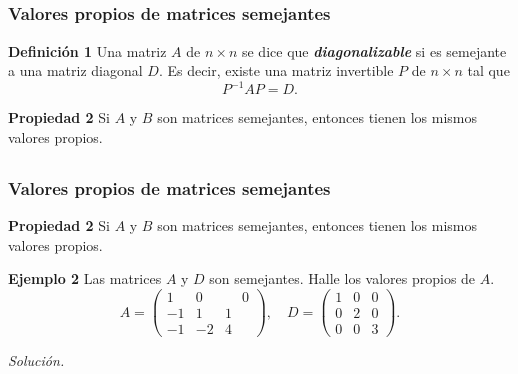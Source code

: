 
\subsection{}

\begin{frame}\frametitle{Valores propios de matrices semejantes}

\begin{defi}{\textbf{Definición 1}}\justifying
	\justifying
	Una matriz $A$ de $n\times n$ se dice que \textbf{\textit{diagonalizable}} si es semejante a una matriz
	diagonal $D$. Es decir, existe una matriz invertible $P$  de $n\times n$  tal que 
	\[
		P^{-1}AP = D.
	\]
\end{defi}	

\begin{prop}{\textbf{Propiedad 2}}
	\justifying
	Si $A$ y $B$ son matrices semejantes, entonces tienen los mismos valores propios.
\end{prop}	

\end{frame}


\subsection{}

\begin{frame}\frametitle{Valores propios de matrices semejantes}
	
	\begin{prop}{\textbf{Propiedad 2}}
		\justifying
		Si $A$ y $B$ son matrices semejantes, entonces tienen los mismos valores propios.
	\end{prop}	
	
	\begin{ej}{\textbf{Ejemplo 2}}
		Las matrices $A$ y $D$ son semejantes. Halle los valores propios de $A$.
		\[
		A =
		\left(
		\begin{array}{rrr}
		1  &  0 & \phantom{-}0 \\[1mm]
		-1 &  1 & 1 \\[1mm]
		-1 & -2 & 4
		\end{array}
		\right),\quad
		D =
		\left(
		\begin{array}{rrr}
		1 & 0 & 0 \\[1mm]
		0 & 2 & 0 \\[1mm]
		0 & 0 & 3
		\end{array}
		\right).
		\]	
	\end{ej}
	\textit{Solución.}
	
\end{frame}

